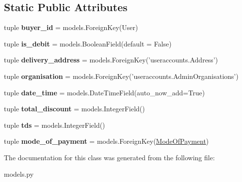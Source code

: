 \subsection*{Static Public Attributes}
\begin{DoxyCompactItemize}
\item 
\hypertarget{classlibrehatti_1_1catalog_1_1models_1_1PurchaseOrder_a2768a892466a2be1f40b05ab7d4d6d56}{tuple {\bfseries buyer\-\_\-id} = models.\-Foreign\-Key(User)}\label{classlibrehatti_1_1catalog_1_1models_1_1PurchaseOrder_a2768a892466a2be1f40b05ab7d4d6d56}

\item 
\hypertarget{classlibrehatti_1_1catalog_1_1models_1_1PurchaseOrder_abe0c5fe56c845603360c5c0b27885337}{tuple {\bfseries is\-\_\-debit} = models.\-Boolean\-Field(default = False)}\label{classlibrehatti_1_1catalog_1_1models_1_1PurchaseOrder_abe0c5fe56c845603360c5c0b27885337}

\item 
\hypertarget{classlibrehatti_1_1catalog_1_1models_1_1PurchaseOrder_a906409ea32a270b2d2aa9c4cef6919e2}{tuple {\bfseries delivery\-\_\-address} = models.\-Foreign\-Key('useraccounts.\-Address')}\label{classlibrehatti_1_1catalog_1_1models_1_1PurchaseOrder_a906409ea32a270b2d2aa9c4cef6919e2}

\item 
\hypertarget{classlibrehatti_1_1catalog_1_1models_1_1PurchaseOrder_aa8ad9c440b1993397b7189f58d878fd0}{tuple {\bfseries organisation} = models.\-Foreign\-Key('useraccounts.\-Admin\-Organisations')}\label{classlibrehatti_1_1catalog_1_1models_1_1PurchaseOrder_aa8ad9c440b1993397b7189f58d878fd0}

\item 
\hypertarget{classlibrehatti_1_1catalog_1_1models_1_1PurchaseOrder_abd767c1140af50d0ce7e5f0229cfaa17}{tuple {\bfseries date\-\_\-time} = models.\-Date\-Time\-Field(auto\-\_\-now\-\_\-add=True)}\label{classlibrehatti_1_1catalog_1_1models_1_1PurchaseOrder_abd767c1140af50d0ce7e5f0229cfaa17}

\item 
\hypertarget{classlibrehatti_1_1catalog_1_1models_1_1PurchaseOrder_abb45b6bc4b47e0563a020ebd64aaa173}{tuple {\bfseries total\-\_\-discount} = models.\-Integer\-Field()}\label{classlibrehatti_1_1catalog_1_1models_1_1PurchaseOrder_abb45b6bc4b47e0563a020ebd64aaa173}

\item 
\hypertarget{classlibrehatti_1_1catalog_1_1models_1_1PurchaseOrder_a2666468af212f2b0e606dec24b6f0edd}{tuple {\bfseries tds} = models.\-Integer\-Field()}\label{classlibrehatti_1_1catalog_1_1models_1_1PurchaseOrder_a2666468af212f2b0e606dec24b6f0edd}

\item 
\hypertarget{classlibrehatti_1_1catalog_1_1models_1_1PurchaseOrder_ad331d566b7b412ad4ac420e7ea6cd931}{tuple {\bfseries mode\-\_\-of\-\_\-payment} = models.\-Foreign\-Key(\hyperlink{classlibrehatti_1_1catalog_1_1models_1_1ModeOfPayment}{Mode\-Of\-Payment})}\label{classlibrehatti_1_1catalog_1_1models_1_1PurchaseOrder_ad331d566b7b412ad4ac420e7ea6cd931}

\end{DoxyCompactItemize}


The documentation for this class was generated from the following file\-:\begin{DoxyCompactItemize}
\item 
models.\-py\end{DoxyCompactItemize}
